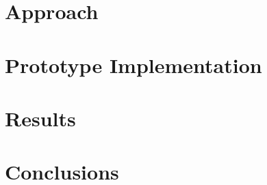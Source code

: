 \documentclass{sig-alternate-05-2015}
\begin{document}
\section{Approach}
\label{sec:approach}


\section{Prototype Implementation}
\label{sec:impl}


\section{Results}
\label{sec:results}

\section{Conclusions}
\label{sec:conclusion}


%

%
\newpage

%
%
\end{document}
